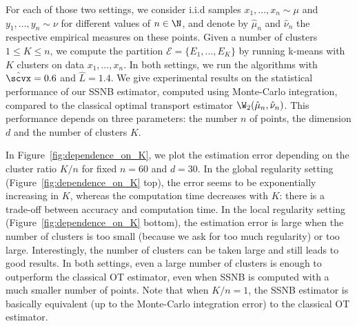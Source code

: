 For each of those two settings, we consider i.i.d samples $x_1, \ldots, x_n \sim \mu$ and $y_1,  \ldots, y_n \sim \nu$ for different values of $n \in \N$, and denote by $\hat\mu_n$ and $\hat\nu_n$ the respective empirical measures on these points. Given a number of clusters $1 \leq K \leq n$, we compute the partition $\mathcal{E} = \{E_1, \ldots, E_K\}$ by running k-means with $K$ clusters on data $x_1, \ldots, x_n$. In both settings, we run the algorithms with $\hat\scvx=0.6$ and $\hat L=1.4$. We give experimental results on the statistical performance of our SSNB estimator, computed using Monte-Carlo integration, compared to the classical optimal transport estimator $\W_2(\hat\mu_n,\hat\nu_n)$. This performance depends on three parameters: the number $n$ of points, the dimension $d$ and the number of clusters $K$.

In Figure~\ref{fig:dependence_on_K}, we plot the estimation error depending on the cluster ratio $K/n$ for fixed $n=60$ and $d=30$. In the global regularity setting (Figure~\ref{fig:dependence_on_K} top), the error seems to be exponentially increasing in $K$, whereas the computation time decreases with $K$: there is a trade-off between accuracy and computation time. In the local regularity setting (Figure~\ref{fig:dependence_on_K} bottom), the estimation error is large when the number of clusters is too small (because we ask for too much regularity) or too large. Interestingly, the number of clusters can be taken large and still leads to good results. In both settings, even a large number of clusters is enough to outperform the classical OT estimator, even when SSNB is computed with a much smaller number of points. Note that when $K/n = 1$, the SSNB estimator is basically equivalent (up to the Monte-Carlo integration error) to the classical OT estimator.

